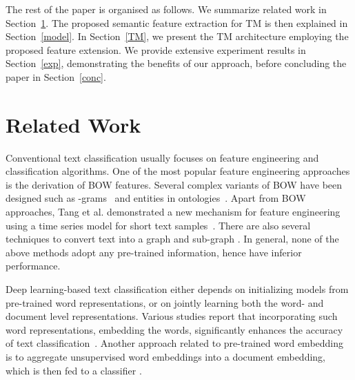 \documentclass[11pt]{article}
\begin{document}
\par The rest of the paper is organised as follows. We summarize related work in Section~\ref{RW}. The proposed semantic feature extraction for TM is then explained in Section~\ref{model}. In Section~\ref{TM}, we present the  TM architecture employing the proposed feature extension. We provide extensive experiment results in Section~\ref{exp}, demonstrating the benefits of our approach, before concluding the paper in Section~\ref{conc}.





\section{Related Work}\label{RW}
Conventional text classification usually focuses on feature engineering and classification algorithms. One of the most popular feature engineering approaches is the derivation of BOW features. Several complex variants of BOW have been designed such as -grams~\cite{wang2012} and entities in ontologies~\cite{ChenthamarakshanMSL11}. Apart from BOW approaches, Tang et al. demonstrated a new mechanism for feature engineering using a time series model for short text samples~\cite{Tang2020EnrichingFE}. There are also several techniques to convert text into a graph and sub-graph \cite{rousseau2015, Luo2017BridgingSA}. In general, none of the above methods adopt any pre-trained information, hence have inferior performance.

\par Deep learning-based text classification either depends on initializing models from pre-trained word representations, or on jointly learning both the word- and document level representations. Various studies report that incorporating such word representations, embedding the words, significantly enhances the accuracy of text classification~\cite{joulin2017bag,shen2018}. Another approach related to pre-trained word embedding is to aggregate unsupervised word embeddings into a document embedding, which is then fed to a classifier \cite{pmlrle14, jianPTE}. 
\end{document}
